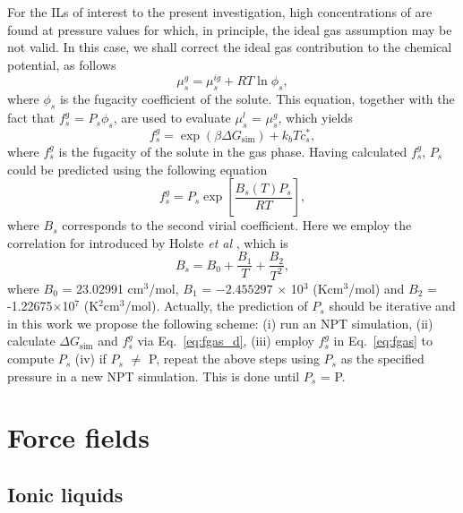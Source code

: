 \documentclass[3p,twocolumn]{elsarticle}
\begin{document}
For the ILs of interest to the present investigation, high concentrations of  are found at pressure values for which, in principle, the ideal gas assumption may be not valid. In this case, we shall correct the ideal gas contribution to the chemical potential, as follows
\begin{equation}
\label{eq:mu_gas_real}
\mu^{g}_s = \mu^{ig}_s + RT \ln \phi_s,
\end{equation}
where $\phi_s$ is the fugacity coefficient of the solute. This equation, together with the fact that $f^{g}_s$ = $P_s \phi_s$, are used to evaluate $\mu^{l}_s$ = $\mu^{g}_s$, which yields
\begin{equation}
\label{eq:fgas_d}
f^{g}_s = \exp  \left( \beta \Delta G_{\text{sim}} \right) +  k_b T c_s^{\ast}, 
\end{equation}
where $f^{g}_s$ is the fugacity of the solute in the gas phase. Having calculated $f^{g}_s$, $P_s$ could be predicted using the following equation
\begin{equation}
\label{eq:fgas}
f^{g}_s = P_s \exp\left[ \frac{B_s(T) P_s}{R T} \right],
\end{equation}
where $B_s$ corresponds to the second virial coefficient. Here we employ the correlation for  introduced by Holste \textit{et al} \cite{Holste_1987}, which is
\begin{equation}
B_s = B_0 + \frac{B_1}{T} + \frac{B_2}{T^2},
\end{equation}
where $B_0$ = 23.02991 cm$^3$/mol, $B_1$ = $-2.455297$ $\times$ 10$^3$ (Kcm$^3$/mol) and $B_2$ = -1.22675$\times$10$^7$ (K$^2$cm$^3$/mol). Actually, the prediction of $P_s$ should be iterative and in this work we propose the following scheme: (i) run an NPT simulation, (ii) calculate $\Delta G_{\text{sim}}$ and $f^{g}_s$ via Eq.~\ref{eq:fgas_d}, (iii) employ $f^{g}_s$ in Eq.~\ref{eq:fgas} to compute $P_s$ (iv) if $P_s$ $\neq$ P, repeat the above steps using $P_s$ as the specified pressure in a new NPT simulation. This is done until $P_s$ = P.

\section{Force fields}
\label{sec:force_field}
\subsection{Ionic liquids}
\label{sec:force_field_il}
\end{document}
